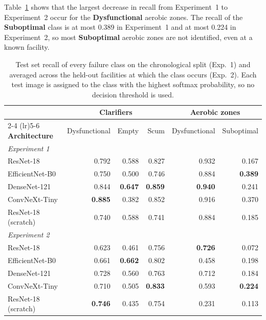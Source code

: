 Table~\ref{tab:res_failure_recall} shows that the largest decrease in recall from Experiment~1 to Experiment~2 occur for the \textbf{Dysfunctional} aerobic zones. The recall of the \textbf{Suboptimal} class is at most 0.389 in Experiment~1 and at most 0.224 in Experiment~2, so most \textbf{Suboptimal} aerobic zones are not identified, even at a known facility.

\begin{table}[htbp]
\centering
\setlength{\tabcolsep}{5pt}
\caption{Test set recall of every failure class on the chronological split (Exp.~1) and averaged across the held-out facilities at which the class occurs (Exp.~2). Each test image is assigned to the class with the highest softmax probability, so no decision threshold is used.}
\label{tab:res_failure_recall}
\begin{tabular}{l rrr rr}
\toprule
& \multicolumn{3}{c}{\textbf{Clarifiers}} & \multicolumn{2}{c}{\textbf{Aerobic zones}} \\
\cmidrule(lr){2-4} \cmidrule(lr){5-6}
\textbf{Architecture} & Dysfunctional & Empty & Scum & Dysfunctional & Suboptimal \\
\midrule
\multicolumn{6}{l}{\textit{Experiment 1}} \\
ResNet-18 & 0.792 & 0.588 & 0.827 & 0.932 & 0.167 \\
EfficientNet-B0 & 0.750 & 0.500 & 0.746 & 0.884 & \textbf{0.389} \\
DenseNet-121 & 0.844 & \textbf{0.647} & \textbf{0.859} & \textbf{0.940} & 0.241 \\
ConvNeXt-Tiny & \textbf{0.885} & 0.382 & 0.852 & 0.916 & 0.370 \\
ResNet-18 (scratch) & 0.740 & 0.588 & 0.741 & 0.884 & 0.185 \\
\midrule
\multicolumn{6}{l}{\textit{Experiment 2}} \\
ResNet-18 & 0.623 & 0.461 & 0.756 & \textbf{0.726} & 0.072 \\
EfficientNet-B0 & 0.661 & \textbf{0.662} & 0.802 & 0.458 & 0.198 \\
DenseNet-121 & 0.728 & 0.560 & 0.763 & 0.712 & 0.184 \\
ConvNeXt-Tiny & 0.710 & 0.505 & \textbf{0.833} & 0.593 & \textbf{0.224} \\
ResNet-18 (scratch) & \textbf{0.746} & 0.435 & 0.754 & 0.231 & 0.113 \\
\bottomrule
\end{tabular}
\end{table}



